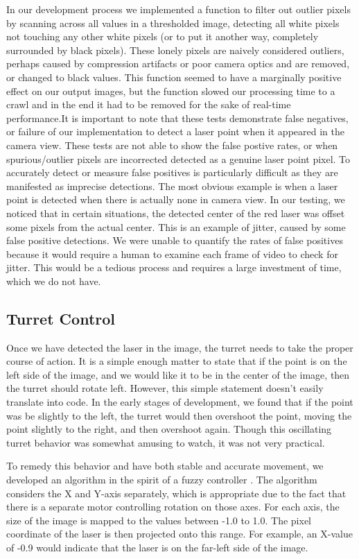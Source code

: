 \documentclass[10pt,twocolumn,letterpaper]{article}
\begin{document}
In our development process we implemented a function to filter out outlier pixels by scanning across all values in a thresholded image, detecting all white pixels not touching any other white pixels (or to put it another way, completely surrounded by black pixels).  These lonely pixels are naively considered outliers, perhaps caused by compression artifacts or poor camera optics and are removed, or changed to black values.  This function seemed to have a marginally positive effect on our output images, but the function slowed our processing time to a crawl and in the end it had to be removed for the sake of real-time performance.It is important to note that these tests demonstrate false negatives, or failure of our implementation to detect a laser point when it appeared in the camera view.  These tests are not able to show the false postive rates, or when spurious/outlier pixels are incorrected detected as a genuine laser point pixel.  To accurately detect or measure false positives is particularly difficult as they are manifested as imprecise detections.  The most obvious example is when a laser point is detected when there is actually none in camera view.  In our testing, we noticed that in certain situations, the detected center of the red laser was offset some pixels from the actual center.  This is an example of jitter, caused by some false positive detections.  We were unable to quantify the rates of false positives because it would require a human to examine each frame of video to check for jitter.  This would be a tedious process and requires a large investment of time, which we do not have.

\subsection{Turret Control}

Once we have detected the laser in the image, the turret needs to take the proper course of action. It is a simple enough matter to state that if the point is on the left side of the image, and we would like it to be in the center of the image, then the turret should rotate left. However, this simple statement doesn't easily translate into code.  In the early stages of development, we found that if the point was be slightly to the left, the turret would then overshoot the point, moving the point slightly to the right, and then overshoot again. Though this oscillating turret behavior was somewhat amusing to watch, it was not very practical.

To remedy this behavior and have both stable and accurate movement, we developed an algorithm in the spirit of a fuzzy controller \cite{jantzen98Logic}. The algorithm considers the X and Y-axis separately, which is appropriate due to the fact that there is a separate motor controlling rotation on those axes. For each axis, the size of the image is mapped to the values between -1.0 to 1.0. The pixel coordinate of the laser is then projected onto this range. For example, an X-value of -0.9 would indicate that the laser is on the far-left side of the image.
\end{document}
